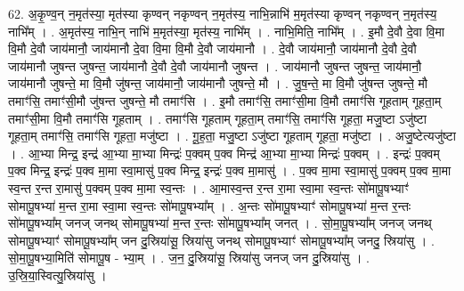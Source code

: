 \documentclass[17pt]{extarticle}
\begin{document}
62. अ॒कृ॒ण्व॒न् न॒मृत॑स्या॒ मृत॑स्या कृण्वन् नकृण्वन् न॒मृत॑स्य॒ नाभि॒न्नाभि॑ म॒मृत॑स्या कृण्वन् नकृण्वन् न॒मृत॑स्य॒ नाभि᳚म् । . अ॒मृत॑स्य॒ नाभि॒न् नाभि॑ म॒मृत॑स्या॒ मृत॑स्य॒ नाभि᳚म् । . नाभि॒मिति॒ नाभि᳚म् । . इ॒मौ दे॒वौ दे॒वा वि॒मा वि॒मौ दे॒वौ जाय॑मानौ॒ जाय॑मानौ दे॒वा वि॒मा वि॒मौ दे॒वौ जाय॑मानौ । . दे॒वौ जाय॑मानौ॒ जाय॑मानौ दे॒वौ दे॒वौ जाय॑मानौ जुषन्त जुषन्त॒ जाय॑मानौ दे॒वौ दे॒वौ जाय॑मानौ जुषन्त । . जाय॑मानौ जुषन्त जुषन्त॒ जाय॑मानौ॒ जाय॑मानौ जुषन्ते॒ मा वि॒मौ जु॑षन्त॒ जाय॑मानौ॒ जाय॑मानौ जुषन्ते॒ मौ । . जु॒ष॒न्ते॒ मा वि॒मौ जु॑षन्त जुषन्ते॒ मौ तमाꣳ॑सि॒ तमाꣳ॑सी॒मौ जु॑षन्त जुषन्ते॒ मौ तमाꣳ॑सि । . इ॒मौ तमाꣳ॑सि॒ तमाꣳ॑सी॒मा वि॒मौ तमाꣳ॑सि गूहताम् गूहता॒म् तमाꣳ॑सी॒मा वि॒मौ तमाꣳ॑सि गूहताम् । . तमाꣳ॑सि गूहताम् गूहता॒म् तमाꣳ॑सि॒ तमाꣳ॑सि गूहता॒ मजु॒ष्टा ऽजु॑ष्टा गूहता॒म् तमाꣳ॑सि॒ तमाꣳ॑सि गूहता॒ मजु॑ष्टा । . गू॒ह॒ता॒ मजु॒ष्टा ऽजु॑ष्टा गूहताम् गूहता॒ मजु॑ष्टा । . अजु॒ष्टेत्यजु॑ष्टा । . आ॒भ्या मिन्द्र॒ इन्द्र॑ आ॒भ्या मा॒भ्या मिन्द्रः॑ प॒क्वम् प॒क्व मिन्द्र॑ आ॒भ्या मा॒भ्या मिन्द्रः॑ प॒क्वम् । . इन्द्रः॑ प॒क्वम् प॒क्व मिन्द्र॒ इन्द्रः॑ प॒क्व मा॒मा स्वा॒मासु॑ प॒क्व मिन्द्र॒ इन्द्रः॑ प॒क्व मा॒मासु॑ । . प॒क्व मा॒मा स्वा॒मासु॑ प॒क्वम् प॒क्व मा॒मा स्व॒न्त र॒न्त रा॒मासु॑ प॒क्वम् प॒क्व मा॒मा स्व॒न्तः । . आ॒मास्व॒न्त र॒न्त रा॒मा स्वा॒मा स्व॒न्तः सो॑मापू॒षभ्याꣳ॑ सोमापू॒षभ्या॑ म॒न्त रा॒मा स्वा॒मा स्व॒न्तः सो॑मापू॒षभ्या᳚म् । . अ॒न्तः सो॑मापू॒षभ्याꣳ॑ सोमापू॒षभ्या॑ म॒न्त र॒न्तः सो॑मापू॒षभ्या᳚म् जनज् जनथ् सोमापू॒षभ्या॑ म॒न्त र॒न्तः सो॑मापू॒षभ्या᳚म् जनत् । . सो॒मा॒पू॒षभ्या᳚म् जनज् जनथ् सोमापू॒षभ्याꣳ॑ सोमापू॒षभ्या᳚म् जन दु॒स्रिया॑सू॒ स्रिया॑सु जनथ् सोमापू॒षभ्याꣳ॑ सोमापू॒षभ्या᳚म् जनदु॒ स्रिया॑सु । . सो॒मा॒पू॒षभ्या॒मिति॑ सोमापू॒ष - भ्या॒म् । . ज॒न॒ दु॒स्रिया॑सू॒ स्रिया॑सु जनज् जन दु॒स्रिया॑सु । . उ॒स्रि॒या॒स्वित्यु॒स्रिया॑सु । \newline
\pagebreak
\end{document}
